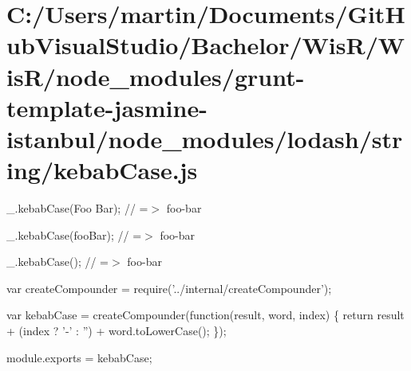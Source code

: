 \hypertarget{_c_1_2_users_2martin_2_documents_2_git_hub_visual_studio_2_bachelor_2_wis_r_2_wis_r_2node_module529e743eb0d6ab8d76793f749e3d06e5}{}\section{C\+:/\+Users/martin/\+Documents/\+Git\+Hub\+Visual\+Studio/\+Bachelor/\+Wis\+R/\+Wis\+R/node\+\_\+modules/grunt-\/template-\/jasmine-\/istanbul/node\+\_\+modules/lodash/string/kebab\+Case.\+js}
\+\_\+.\+kebab\+Case(\textquotesingle{}Foo Bar\textquotesingle{}); // =$>$ \textquotesingle{}foo-\/bar\textquotesingle{}

\+\_\+.\+kebab\+Case(\textquotesingle{}foo\+Bar\textquotesingle{}); // =$>$ \textquotesingle{}foo-\/bar\textquotesingle{}

\+\_\+.\+kebab\+Case(\textquotesingle{}); // =$>$ \textquotesingle{}foo-\/bar\textquotesingle{}


\begin{DoxyCodeInclude}
var createCompounder = require(\textcolor{stringliteral}{'../internal/createCompounder'});

var kebabCase = createCompounder(\textcolor{keyword}{function}(result, word, index) \{
  \textcolor{keywordflow}{return} result + (index ? \textcolor{charliteral}{'-'} : \textcolor{stringliteral}{''}) + word.toLowerCase();
\});

module.exports = kebabCase;
\end{DoxyCodeInclude}
 